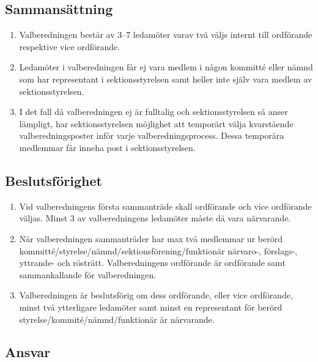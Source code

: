 \documentclass[11pt,a4paper]{article}
\begin{document}
\subsection{Sammansättning}

\begin{enumerate}[\thesubsection.1]


  
  \item Valberedningen består av 3–7 ledamöter varav två väljs internt till ordförande respektive vice ordförande.
  
  \item Ledamöter i valberedningen får ej vara medlem i någon kommitté eller nämnd som har representant i sektionsstyrelsen samt heller inte själv vara medlem av sektionsstyrelsen.

\item I det fall då valberedningen ej är fulltalig och sektionsstyrelsen så anser lämpligt, har sektionsstyrelsen möjlighet att temporärt välja kvarstående valberedningsposter inför varje valberedningsprocess. Dessa temporära medlemmar får inneha post i sektionsstyrelsen.
\end{enumerate}

\subsection{Beslutsförighet}

\begin{enumerate}[\thesubsection.1]

\item Vid valberedningens första sammanträde skall ordförande och vice ordförande väljas. Minst 3 av valberedningens ledamöter måste då vara närvarande.

  \item När valberedningen sammanträder har max två medlemmar ur berörd kommitté/\-styrelse/nämnd/sektionsförening/funktionär närvaro-, för\-slags-, yttrande- och rösträtt. Valberedningens  ord\-för\-ande är ordförande samt sammankallande för valberedningen.

  \item Valberedningen är beslutsförig om dess ordförande, eller vice ordförande, minst två ytterligare ledamöter samt minst en representant för berörd styrelse/\-kommité/\-nämnd/\-funktionär är närvarande.

\end{enumerate}

\subsection{Ansvar}
\end{document}
